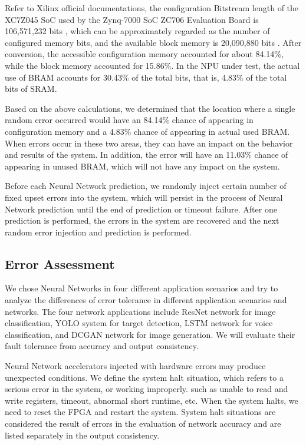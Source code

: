 Refer to Xilinx official documentations, the configuration 
Bitstream length of the XC7Z045 SoC used by the Zynq-7000 
SoC ZC706 Evaluation Board is 106,571,232 bits \cite{UG585}, which can 
be approximately regarded as the number of configured 
memory bits, and the available block memory is 20,090,880 
bits \cite{DS190}. After conversion, the accessible configuration memory 
accounted for about 84.14\%, while the block memory 
accounted for 15.86\%. In the NPU under test, the actual 
use of BRAM accounts for 30.43\% of the total bits, that is, 
4.83\% of the total bits of SRAM.

Based on the above calculations, we determined that the 
location where a single random error occurred would have an 
84.14\% chance of appearing in configuration memory and a 
4.83\% chance of appearing in actual used BRAM. When errors 
occur in these two areas, they can have an impact on the 
behavior and results of the system. In addition, the error 
will have an 11.03\% chance of appearing in unused BRAM, 
which will not have any impact on the system.

Before each Neural Network prediction, we randomly inject 
certain number of fixed upset errors into the system, which 
will persist in the process of Neural Network prediction 
until the end of prediction or timeout failure. After one 
prediction is performed, the errors in the system are 
recovered and the next random error injection and 
prediction is performed.


\subsection{Error Assessment}
We chose Neural Networks in four different application 
scenarios and try to analyze the differences of error 
tolerance in different application scenarios and networks. 
The four network applications include ResNet network for 
image classification, YOLO system for target detection, 
LSTM network for voice classification, and DCGAN network 
for image generation. We will evaluate their fault 
tolerance from accuracy and output consistency.

Neural Network accelerators injected with hardware errors 
may produce unexpected conditions. We define the system 
halt situation, which refers to a serious error in the 
system, or working improperly. such as unable to read and 
write registers, timeout, abnormal short runtime, etc. When 
the system halts, we need to reset the FPGA and restart the 
system. System halt situations are considered the result of 
errors in the evaluation of network accuracy and are listed 
separately in the output consistency.

